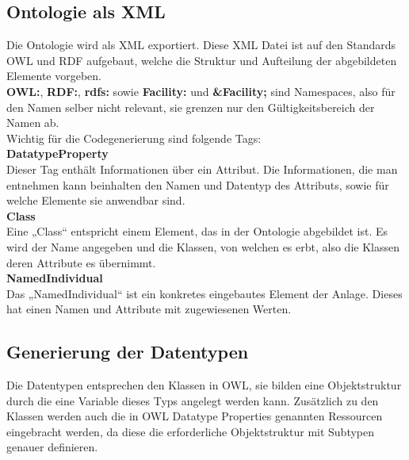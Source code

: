 

\subsection{Ontologie als \ac{XML}}
Die Ontologie wird als \ac{XML} exportiert. Diese \ac{XML} Datei ist auf den Standards \ac{OWL} und \ac{RDF} aufgebaut, welche die Struktur und Aufteilung der abgebildeten Elemente vorgeben.\\

\textbf{\ac{OWL}:}, \textbf{\ac{RDF}:}, \textbf{rdfs:} sowie \textbf{Facility:} und \textbf{\&Facility;} sind Namespaces, also für den Namen selber nicht relevant, sie grenzen nur den Gültigkeitsbereich der Namen ab.\\

Wichtig für die Codegenerierung sind folgende Tags:\\

\textbf{DatatypeProperty}\\
Dieser Tag enthält Informationen über ein Attribut. Die Informationen, die man entnehmen kann beinhalten den Namen und Datentyp des Attributs, sowie für welche Elemente sie anwendbar sind.\\

\textbf{Class}\\
Eine „Class“ entspricht einem Element, das in der Ontologie abgebildet ist. Es wird der Name angegeben und die Klassen, von welchen es erbt, also die Klassen deren Attribute es übernimmt.\\


\textbf{NamedIndividual}\\
Das „NamedIndividual“ ist ein konkretes eingebautes Element der Anlage. Dieses hat einen Namen und Attribute mit zugewiesenen Werten.\\


\subsection{Generierung der Datentypen}
Die Datentypen entsprechen den Klassen in \ac{OWL}, sie bilden eine Objektstruktur durch die eine Variable dieses Typs angelegt werden kann. Zusätzlich zu den Klassen werden auch die in \ac{OWL} Datatype Properties genannten Ressourcen eingebracht werden, da diese die erforderliche Objektstruktur mit Subtypen genauer definieren.\\

